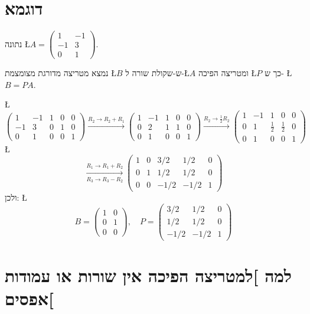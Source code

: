 \documentclass[english,hebrew]{article}
\begin{document}
\section{דוגמא}

נתונה \L{$A=\begin{pmatrix}1 & -1\\
-1 & 3\\
0 & 1
\end{pmatrix}$}.

נמצא מטריצה מדורגת מצומצמת \L{$B$} ש-שקולת שורה ל-\L{$A$} ומטריצה
הפיכה \L{$P$} כך ש- \L{$B=PA$}.

\L{%
\[
\left(\begin{array}{cc|ccc}
1 & -1 & 1 & 0 & 0\\
-1 & 3 & 0 & 1 & 0\\
0 & 1 & 0 & 0 & 1
\end{array}\right)\xrightarrow{R_{2}\to R_{2}+R_{1}}\left(\begin{array}{cc|ccc}
1 & -1 & 1 & 0 & 0\\
0 & 2 & 1 & 1 & 0\\
0 & 1 & 0 & 0 & 1
\end{array}\right)\xrightarrow{R_{2}\to\frac{1}{2}R_{2}}\left(\begin{array}{cc|ccc}
1 & -1 & 1 & 0 & 0\\
0 & 1 & \frac{1}{2} & \frac{1}{2} & 0\\
0 & 1 & 0 & 0 & 1
\end{array}\right)
\]
}%
\L{%
\[
\xrightarrow[R_{3}\to R_{3}-R_{2}]{R_{1}\to R_{1}+R_{2}}\left(\begin{array}{cc|ccc}
1 & 0 & 3/2 & 1/2 & 0\\
0 & 1 & 1/2 & 1/2 & 0\\
0 & 0 & -1/2 & -1/2 & 1
\end{array}\right)
\]
}%
ולכן: \L{%
\[
B=\begin{pmatrix}1 & 0\\
0 & 1\\
0 & 0
\end{pmatrix},\quad P=\begin{pmatrix}3/2 & 1/2 & 0\\
1/2 & 1/2 & 0\\
-1/2 & -1/2 & 1
\end{pmatrix}
\]
}%

\section{למה {]}למטריצה הפיכה אין שורות או עמודות אפסים{[}}
\end{document}
